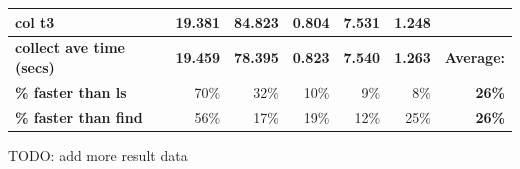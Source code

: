 \documentclass[12pt]{article}
\begin{document}
\begin{center}
\begin{tabular}{|l|r|r|r|r|r|l|}
    \textbf{col t3}                  & 19.381                            & 84.823                            & 0.804                                                                                    & 7.531                                                                                       & 1.248                                                                                         &                                    \\ \hline
    \textbf{collect ave time (secs)} & \textbf{19.459}                   & \textbf{78.395}                   & \textbf{0.823}                                                                           & \textbf{7.540}                                                                              & \textbf{1.263}                                                                                & \textbf{Average:}                  \\ \hline
    \textbf{\% faster than ls}       & 70\%                              & 32\%                              & 10\%                                                                                     & 9\%                                                                                         & 8\%                                                                                           & \multicolumn{1}{r|}{\textbf{26\%}} \\ \hline
    \textbf{\% faster than find}     & 56\%                              & 17\%                              & 19\%                                                                                     & 12\%                                                                                        & 25\%                                                                                          & \multicolumn{1}{r|}{\textbf{26\%}} \\ \hline
    \end{tabular}
  \label{tab:CollectionAlgorithmData}
\end{center}

TODO: add more result data\\

\newpage


\end{document}
